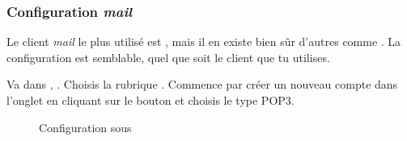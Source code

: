 \subsubsection{Configuration \emph{mail}}

 Le client \emph{mail} le plus
utilisé est , mais il en existe bien sûr d'autres comme
. La configuration est semblable, quel que soit le
client que tu utilises.

Va dans , . Choisis la
rubrique . Commence par créer un nouveau compte dans
l'onglet  en cliquant sur le bouton
 et choisis le type POP3.


\noindent
  \begin{figure}[!h]
    \begin{center}  
         	 \caption{Configuration sous }
    \end{center}
  \end{figure}


